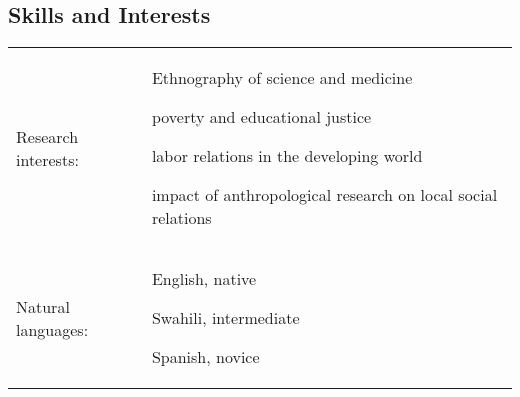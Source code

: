 \subsection{Skills and Interests}
\tabulinesep =0.9mm
\baselineskip
\begin{longtabu} to \linewidth{X[3]X[10]}
	Research interests: &
		\begin{itemize*}[itemjoin={{;\ }}, label=, afterlabel=,]
			\item Ethnography of science and medicine
			\item poverty and educational justice
			\item labor relations in the developing world
			\item impact of anthropological research on local social relations
		\end{itemize*}\\
	Natural languages: &
		\begin{itemize*}[itemjoin={{;\ }}, label=, afterlabel=,]
			\item English, native
			\item Swahili, intermediate
			\item Spanish, novice
		\end{itemize*}\\

\end{longtabu}
